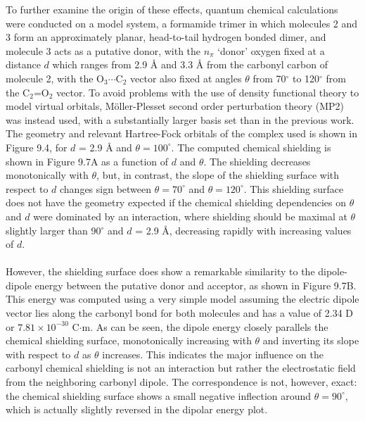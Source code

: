 \begin{doublespace}
To further examine the origin of these effects, quantum chemical calculations
were conducted on a model system, a formamide trimer in which molecules 2 and 3
form an approximately planar, head-to-tail hydrogen bonded dimer, and molecule
3 acts as a putative \npistar{} donor, with the $n_\pi$ `donor' oxygen fixed at
a distance $d$ which ranges from 2.9 \r{A} and 3.3 \r{A} from the carbonyl
carbon of molecule 2, with the O$_3\cdots$C$_2$ vector also fixed at angles
$\theta$ from 70$^\circ$ to 120$^\circ$ from the C$_2$=O$_2$ vector. To avoid
problems with the use of density functional theory to model virtual
orbitals, M\"{o}ller-Plesset second order perturbation theory (MP2) was
instead used, with a substantially larger basis set than in the previous work.
The geometry and relevant Hartree-Fock orbitals of the complex used is shown
in Figure 9.4, for $d$ = 2.9 \r{A} and $\theta = 100^\circ$. The computed
chemical shielding is shown in Figure 9.7A as a function of $d$ and $\theta$.
The shielding decreases monotonically with $\theta$, but, in contrast, the
slope of the shielding surface with respect to $d$ changes sign between
$\theta = 70^\circ$ and $\theta = 120^\circ$. This shielding surface does not
have the geometry expected if the chemical shielding dependencies on $\theta$
and $d$ were dominated by an \npipistar{} interaction, where shielding should
be maximal at $\theta$ slightly larger than 90$^\circ$ and $d$ = 2.9 \r{A},
decreasing rapidly with increasing values of $d$.
\\\\
However, the shielding surface does show a remarkable similarity to the
dipole-dipole energy between the putative donor and acceptor, as shown in
Figure 9.7B. This energy was computed using a very simple model assuming the
electric dipole vector lies along the carbonyl bond for both molecules and has
a value of 2.34 D or $7.81 \times 10^{-30}$ C$\cdot$m. As can be seen, the
dipole energy closely parallels the chemical shielding surface, monotonically
increasing with $\theta$ and inverting its slope with respect to $d$ as
$\theta$ increases. This indicates the major influence on the carbonyl \cnmr{}
chemical shielding is not an \npipistar{} interaction but rather the
electrostatic field from the neighboring carbonyl dipole. The correspondence
is not, however, exact: the chemical shielding surface shows a small negative
inflection around $\theta = 90^\circ$, which is actually slightly reversed in
the dipolar energy plot.
\end{doublespace}


